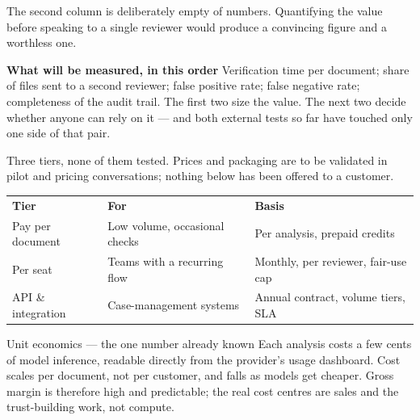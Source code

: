 \documentclass[10pt,a4paper]{article}
\newcommand{\heading}[2]{%
  \par\vspace{12pt}{\color{navy}\bfseries #1\hspace{6pt}#2}\par\vspace{-2pt}}
\newcommand{\fld}[1]{\textbf{\color{navy}#1}\hspace{5pt}}
\begin{document}
\vspace{3pt}
The second column is deliberately empty of numbers. Quantifying the value before
speaking to a single reviewer would produce a convincing figure and a worthless
one.

\vspace{2pt}
\fld{What will be measured, in this order} Verification time per document; share
of files sent to a second reviewer; false positive rate; false negative rate;
completeness of the audit trail. The first two size the value. The next two
decide whether anyone can rely on it --- and both external tests so far have
touched only one side of that pair.

\heading{4.}{Business model \small\color{bad}(hypothesis)}

\vspace{1pt}
{\footnotesize\color{muted}Three tiers, none of them tested. Prices and
packaging are to be validated in pilot and pricing conversations; nothing below
has been offered to a customer.}

\vspace{2pt}
\begin{tabular}{@{}>{\raggedright\arraybackslash}p{27mm}
                  >{\raggedright\arraybackslash}p{44mm}
                  >{\raggedright\arraybackslash}p{\dimexpr\linewidth-80mm}@{}}
\rowcolor{zebra}\textbf{\color{navy}Tier} & \textbf{\color{navy}For} &
\textbf{\color{navy}Basis} \\[2pt]
Pay per document & Low volume, occasional checks & Per analysis, prepaid credits \\[3pt]
\rowcolor{zebra}Per seat & Teams with a recurring flow & Monthly, per reviewer, fair-use cap \\[3pt]
API \& integration & Case-management systems & Annual contract, volume tiers, SLA \\
\end{tabular}

\vspace{5pt}
\begin{note}{Unit economics --- the one number already known}
Each analysis costs a few cents of model inference, readable directly from the
provider's usage dashboard. Cost scales per document, not per customer, and
falls as models get cheaper. Gross margin is therefore high and predictable;
the real cost centres are sales and the trust-building work, not compute.
\end{note}
\end{document}

